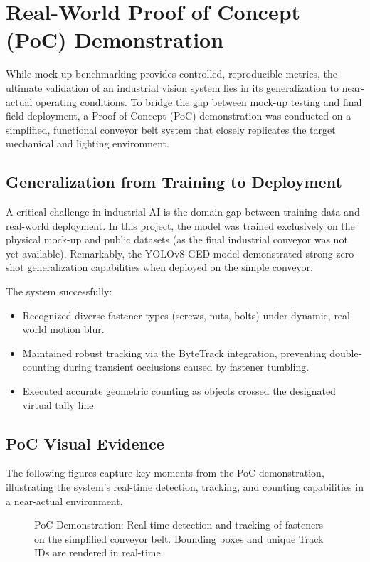 \section{Real-World Proof of Concept (PoC) Demonstration}
\label{sec:poc_demo}

While mock-up benchmarking provides controlled, reproducible metrics, the ultimate validation of an industrial vision system lies in its generalization to near-actual operating conditions. To bridge the gap between mock-up testing and final field deployment, a Proof of Concept (PoC) demonstration was conducted on a simplified, functional conveyor belt system that closely replicates the target mechanical and lighting environment.

\subsection{Generalization from Training to Deployment}
A critical challenge in industrial AI is the domain gap between training data and real-world deployment. In this project, the model was trained exclusively on the physical mock-up and public datasets (as the final industrial conveyor was not yet available). Remarkably, the YOLOv8-GED model demonstrated strong zero-shot generalization capabilities when deployed on the simple conveyor.

The system successfully:
\begin{itemize}
    \item Recognized diverse fastener types (screws, nuts, bolts) under dynamic, real-world motion blur.
    \item Maintained robust tracking via the ByteTrack integration, preventing double-counting during transient occlusions caused by fastener tumbling.
    \item Executed accurate geometric counting as objects crossed the designated virtual tally line.
\end{itemize}

\subsection{PoC Visual Evidence}
The following figures capture key moments from the PoC demonstration, illustrating the system's real-time detection, tracking, and counting capabilities in a near-actual environment.

\begin{figure}[htbp]
    \centering
    \caption{PoC Demonstration: Real-time detection and tracking of fasteners on the simplified conveyor belt. Bounding boxes and unique Track IDs are rendered in real-time.}
    \label{fig:poc_wide}
\end{figure}


